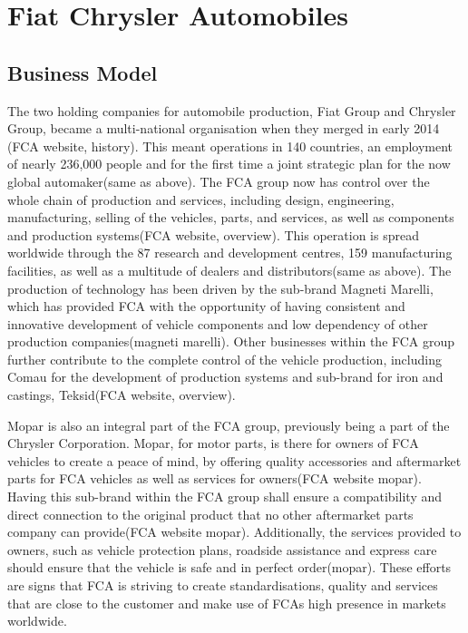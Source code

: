 \section{Fiat Chrysler Automobiles}

\subsection{Business Model}
The two holding companies for automobile production, Fiat Group and Chrysler Group, became a multi-national organisation when they merged in early 2014 (FCA website, history). This meant operations in 140 countries, an employment of nearly 236,000 people and for the first time a joint strategic plan for the now global automaker(same as above). The FCA group now has control over the whole chain of production and services, including design, engineering, manufacturing, selling of the vehicles, parts, and services, as well as components and production systems(FCA website, overview). This operation is spread worldwide through the 87 research and development centres, 159 manufacturing facilities, as well as a multitude of dealers and distributors(same as above). The production of technology has been driven by the sub-brand Magneti Marelli, which has provided FCA with the opportunity of having consistent and innovative development of vehicle components and low dependency of other production companies(magneti marelli). Other businesses within the FCA group further contribute to the complete control of the vehicle production, including Comau for the development of production systems and sub-brand for iron and castings, Teksid(FCA website, overview). 

Mopar is also an integral part of the FCA group, previously being a part of the Chrysler Corporation. Mopar, for motor parts, is there for owners of FCA vehicles to create a peace of mind, by offering quality accessories and aftermarket parts for FCA vehicles as well as services for owners(FCA website mopar). Having this sub-brand within the FCA group shall ensure a compatibility and direct connection to the original product that no other aftermarket parts company can provide(FCA website mopar). Additionally, the services provided to owners, such as vehicle protection plans, roadside assistance and express care should ensure that the vehicle is safe and in perfect order(mopar). These efforts are signs that FCA is striving to create standardisations, quality and services that are close to the customer and make use of FCAs high presence in markets worldwide. 
 
